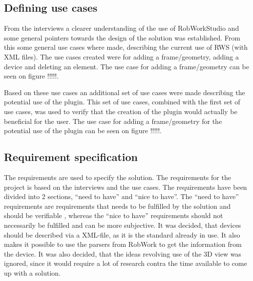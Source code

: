 \subsection{Defining use cases}
From the interviews a clearer understanding of the use of RobWorkStudio and some general pointers towards the design of the solution was established. From this some general use cases where made, describing the current use of RWS (with XML files). The use cases created were for adding a frame/geometry, adding a device and deleting an element. The use case for adding a frame/geometry can be seen on figure !!!!!.

Based on these use cases an additional set of use cases were made describing the potential use of the plugin. This set of use cases, combined with the first set of use cases, was used to verify that the creation of the plugin would actually be beneficial for the user. The use case for adding a frame/geometry for the potential use of the plugin can be seen on figure !!!!!.

\subsection{Requirement specification}
The requirements are used to specify the solution. The requirements for the project is based on the interviews and the use cases. The requirements have been divided into 2 sections, “need to have” and “nice to have”. The “need to have” requirements are requirements that needs to be fulfilled by the solution and should be verifiable , whereas the “nice to have” requirements should not necessarily be fulfilled and can be more subjective. It was decided, that devices should be described via a XML-file, as it is the standard already in use. It also makes it possible to use the parsers from RobWork to get the information from the device. It was also decided, that the ideas revolving use of the 3D view was ignored, since it would require a lot of research contra the time available to come up with a solution.\\

